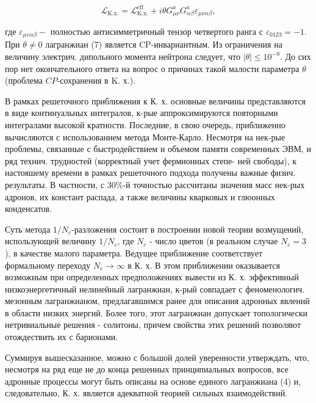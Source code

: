 \documentclass[10pt]{article}
\begin{document}
\[

\mathscr{L}_{\mathrm{K} . \mathrm{x} .}=\mathscr{L}_{\mathrm{K} . \mathrm{x} .}^{\mathrm{eff}}+i \theta G_{\mu \nu}^{a} G_{\alpha \beta}^{a} \varepsilon_{\mu \nu \alpha \beta},

\]



где $\varepsilon_{\mu v \alpha \beta}-$ полностью антисимметричный тензор четвертого ранга с $\varepsilon_{0123}=-1$. При $\theta \neq 0$ лагранжиан (7) является CP-инвариантным. Из ограничения на величину электрич. дипольного момента нейтрона следует, что $|\theta| \leqslant 10^{-9}$. До сих пор нет окончательного ответа на вопрос о причинах такой малости параметра $\theta$ (проблема $C P$-сохранения в K. х.).



В рамках решеточного приближения к К. х. основные величины представляются в виде континуальных интегралов, к-рые аппроксимируются повторными интегралами высокой кратности. Последние, в свою очередь, приближенно вычисляются с использованием метода Монте-Карло. Несмотря на нек-рые проблемы, связанные с быстродействием и объемом памяти современных ЭВМ, и ряд технич. трудностей (корректный учет фермионных степе- ней свободы), к настояшему времени в рамках решеточного подхода получены важные физич. результаты. В частности, с 30\%-й точностью рассчитаны значения масс нек-рых адронов, их констант распада, а также величины кварковых и глюонных конденсатов.



Суть метода $1 / N_{c}$-разложения состоит в построении новой теории возмущений, использующей величину $1 / N_{c}$, где $N_{c}$ - число цветов (в реальном случае $N_{c}=3$ ), в качестве малого параметра. Ведущее приближение соответствует формальному переходу $N_{c} \rightarrow \infty$ в К. х. В этом приближении оказывается возможным при определенных предположениях вывести из К. х. эффективный низкоэнергетичный нелинейный лагранжиан, к-рый совпадает с феноменологич. мезонным лагранжианом, предлагавшимся ранее для описания адронных явлений в области низких энергий. Более того, этот лагранжиан допускает топологически нетривиальные решения - солитоны, причем свойства этих решений позволяют отождествить их с барионами.



Суммируя вышесказанное, можно с большой долей уверенности утверждать, что, несмотря на ряд еще не до конца решенных принципиальных вопросов, все адронные процессы могут быть описаны на основе единого лагранжиана (4) и, следовательно, К. х. является адекватной теорией сильных взаимодействий.
\end{document}
